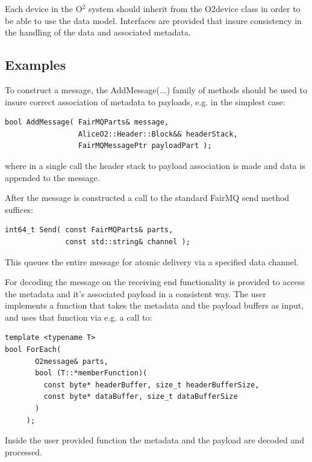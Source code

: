 \documentclass[a4paper,twoside]{article}
\def\O2{O$^2$}
\begin{document}
Each device in the \O2 system should inherit from the O2device class in order to be able to use the data model. Interfaces are provided that insure consistency in the handling of the data and associated metadata.

\subsection{Examples}
To construct a message, the AddMessage(...) family of methods should be used to insure correct association of metadata to payloads, e.g. in the simplest case:
\begin{lstlisting}
bool AddMessage( FairMQParts& message,
                 AliceO2::Header::Block&& headerStack,
                 FairMQMessagePtr payloadPart );
\end{lstlisting}
where in a single call the header stack to payload association is made and data is appended to the message.

After the message is constructed a call to the standard FairMQ send method suffices:
\begin{lstlisting}
int64_t Send( const FairMQParts& parts,
              const std::string& channel );
\end{lstlisting}
This queues the entire message for atomic delivery via a specified data channel.

For decoding the message on the receiving end functionality is provided to access the metadata and it's associated payload in a consistent way. The user implements a function that takes the metadata and the payload buffers as input, and uses that function via e.g. a call to:
\begin{lstlisting}
template <typename T>
bool ForEach(
       O2message& parts,
       bool (T::*memberFunction)(
         const byte* headerBuffer, size_t headerBufferSize,
         const byte* dataBuffer, size_t dataBufferSize
       )
     );
\end{lstlisting}
Inside the user provided function the metadata and the payload are decoded and processed.

\printbibliography
\end{document}

